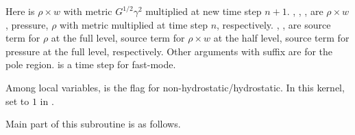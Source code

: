 Here  is $\rho \times w$ with metric $G^{1/2} \gamma^2$
multiplied at new time step $n+1$.
%
, , , are 
$\rho \times w$, pressure, $\rho$
with metric multiplied at time step $n$, respectively.
%
, ,  are
source term for $\rho$ at the full level,
source term for $\rho \times w$ at the half level,
source term for pressure at the full level, respectively.
%
Other arguments with suffix  are for the pole region.
%
 is a time step for fast-mode.

Among local variables,
 is the flag for non-hydrostatic/hydrostatic.
In this kernel, set to $1$ in .




Main part of this subroutine is as follows.

